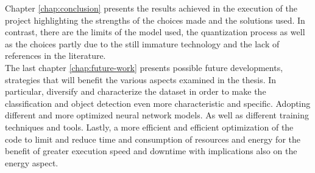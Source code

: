 Chapter \ref{chap:conclusion} presents the results achieved in the execution of 
the project highlighting the strengths of the choices made and the solutions
used.
In contrast, there are the limits of the model used, the quantization process as
well as the choices partly due to the still immature technology and the lack of
references in the literature.\\
\noindent The last chapter \ref{chap:future-work} presents possible future
developments, strategies that will benefit the various aspects examined in the
thesis.
In particular, diversify and characterize the dataset in order to make the
classification and object detection even more characteristic and specific.
Adopting different and more optimized neural network models. 
As well as different training techniques and tools.
Lastly, a more efficient and efficient optimization of the code to limit and 
reduce time and consumption of resources and energy for the benefit of
greater execution speed and downtime with implications also on the energy
aspect.